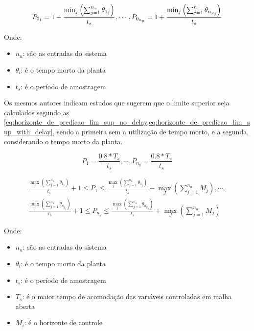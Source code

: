 \begin{equation}
	\label{eq:horizonte_de_predicao_lim_inf_with_delay}
	P_{0_1} = 1 + \frac{\min_j \left( \sum_{j=1}^{n_u} \theta_{1_j} \right)}{t_s}		\\
	, \cdots,																			\\
	P_{0_{n_y}} = 1 + \frac{\min_j \left( \sum_{j=1}^{n_u} \theta_{{n_y}_j} \right)}{t_s}
\end{equation}

\noindent
Onde: 
\begin{itemize}
	\item $n_u$: são as entradas do sistema
	\item $\theta_i$: é o tempo morto da planta
	\item $t_s$: é o período de amostragem
\end{itemize}

Os mesmos autores indicam estudos que sugerem que o limite superior seja calculados segundo
as \cref{eq:horizonte_de_predicao_lim_sup_no_delay,eq:horizonte_de_predicao_lim_sup_with_delay},
sendo a primeira sem a utilização de tempo morto, e a segunda, considerando o tempo morto da planta.

\begin{equation}
	\label{eq:horizonte_de_predicao_lim_sup_no_delay}
    P_{1} = \frac{0.8 * T_s}{t_s} , \cdots, P_{{n_y}} = \frac{0.8 * T_s}{t_s}
\end{equation}

\begin{equation}
	\label{eq:horizonte_de_predicao_lim_sup_with_delay}
	\begin{aligned}
		\frac{\max_j \left( \sum_{j=1}^{n_u} \theta_{1_j} \right)}{t_s} + 1					
		\leqslant P_1 \leqslant																
		\frac{\max_j \left( \sum_{j=1}^{n_u} \theta_{1_j} \right)}{t_s} + 					
		\max_J \left( \sum_{j=1}^{n_u} M_j \right)											
		, \cdots,																			\\
		\frac{\max_j \left( \sum_{j=1}^{n_u} \theta_{{n_y}_j} \right)}{t_s} + 1				
		\leqslant P_{n_y} \leqslant															
		\frac{\max_j \left( \sum_{j=1}^{n_u} \theta_{{n_y}_j} \right)}{t_s} + 				
		\max_J \left( \sum_{j=1}^{n_u} M_j \right)
	\end{aligned}
\end{equation}

\noindent
Onde: 
\begin{itemize}
	\item $n_u$: são as entradas do sistema
	\item $\theta_i$: é o tempo morto da planta
	\item $t_s$: é o período de amostragem
	\item $T_s$: é o maior tempo de acomodação das variáveis controladas em malha aberta
	\item $M_i$: é o horizonte de controle 
\end{itemize}

